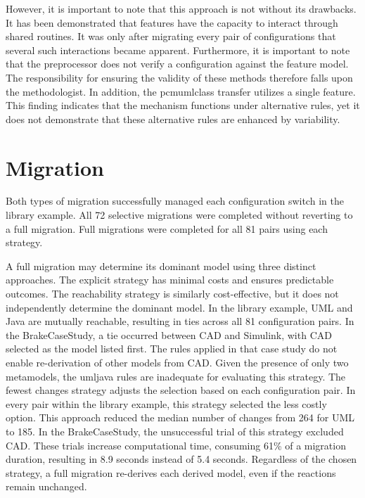 However, it is important to note that this approach is not without its drawbacks.
It has been demonstrated that features have the capacity to interact through shared routines.
It was only after migrating every pair of configurations that several such interactions became apparent.
Furthermore, it is important to note that the preprocessor does not verify a configuration against the feature model.
The responsibility for ensuring the validity of these methods therefore falls upon the methodologist.
In addition, the pcmumlclass transfer utilizes a single feature.
This finding indicates that the mechanism functions under alternative rules, yet it does not demonstrate that these alternative rules are enhanced by variability.

\section{Migration}
\label{sec:Conclusion:Migration}

Both types of migration successfully managed each configuration switch in the library example.
All 72 selective migrations were completed without reverting to a full migration.
Full migrations were completed for all 81 pairs using each strategy.

A full migration may determine its dominant model using three distinct approaches.
The explicit strategy has minimal costs and ensures predictable outcomes.
The reachability strategy is similarly cost-effective, but it does not independently determine the dominant model.
In the library example, UML and Java are mutually reachable, resulting in ties across all 81 configuration pairs.
In the BrakeCaseStudy, a tie occurred between CAD and Simulink, with CAD selected as the model listed first.
The rules applied in that case study do not enable re-derivation of other models from CAD.
Given the presence of only two metamodels, the umljava rules are inadequate for evaluating this strategy.
The fewest changes strategy adjusts the selection based on each configuration pair.
In every pair within the library example, this strategy selected the less costly option.
This approach reduced the median number of changes from 264 for UML to 185.
In the BrakeCaseStudy, the unsuccessful trial of this strategy excluded CAD.
These trials increase computational time, consuming 61\% of a migration duration, resulting in 8.9 seconds instead of 5.4 seconds.
Regardless of the chosen strategy, a full migration re-derives each derived model, even if the reactions remain unchanged.

